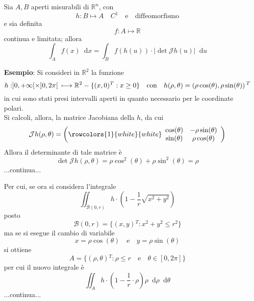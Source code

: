 \documentclass[a4paper]{extarticle}
\newcommand*\dif{\mathop{}\!\mathrm{d}}
\begin{document}
\vspace{2em}
\noindent
Sia $A,B$ aperti misurabili di $\mathbb{R}^n$, con
\[h : B \longmapsto A \hspace{1em} C^1 \hspace{1em} \text{e} \hspace{1em} \text{diffeomorfismo}\]
e sia definita
\[f : A \longmapsto \mathbb{R}\]
continua e limitata; allora
\[\int_A f(x) \dif x = \int_B f(h(u)) \cdot \left \vert \det \mathcal{J} h(u) \right \vert \dif u\]

\vspace{2em}
\noindent
\textbf{Esempio}: Si consideri in $\mathbb{R}^2$ la funzione
\[h : ]0,+\infty[ \times ]0,2\pi[ \hspace{0.5em} \longmapsto \mathbb{R}^2 - \{(x,0){^T} : x \geq 0\} \hspace{1em} \text{con} \hspace{1em} h(\rho,\theta) = \left(\rho \cos(\theta), \rho \sin(\theta)\right){^T}\]
in cui sono stati presi intervalli aperti in quanto necessario per le coordinate polari.\\
Si calcoli, allora, la matrice Jacobiana della $h$, da cui 
\[
    \mathcal{J} h(\rho,\theta) = \left(\rowcolors{1}{white}{white}
    \begin{array}{cc}
       \cos(\theta) & - \rho \sin(\theta)\\
       \sin(\theta) & \rho \cos(\theta)
    \end{array}
    \right)
\]
Allora il determinante di tale matrice è
\[\det \mathcal{J} h(\rho,\theta) = \rho \cos^2(\theta) + \rho \sin^2(\theta) = \rho\]
...continua...

\vspace{1em}
\noindent
Per cui, se ora si considera l'integrale
\[\iint_{\mathcal{B}(0,r)} h \cdot \left(1-\dfrac{1}{r} \sqrt{x^2+y^2}\right)\]
posto
\[\mathcal{B}(0,r) = \{(x,y){^T} : x^2+y^2 \leq r^2\}\]
ma se si esegue il cambio di variabile
\[x=\rho \cos(\theta) \hspace{1em} \text{e} \hspace{1em} y =\rho \sin(\theta)\]
si ottiene
\[A = \{(\rho,\theta){^T} : \rho \leq r \hspace{1em} \text{e} \hspace{1em} \theta \in [0,2\pi]\}\]
per cui il nuovo integrale è
\[\iint_A h \cdot \left(1-\frac{1}{r} \cdot \rho\right) \rho \dif \rho \dif \theta\]
...continua...

\vspace{1em}
\end{document}

